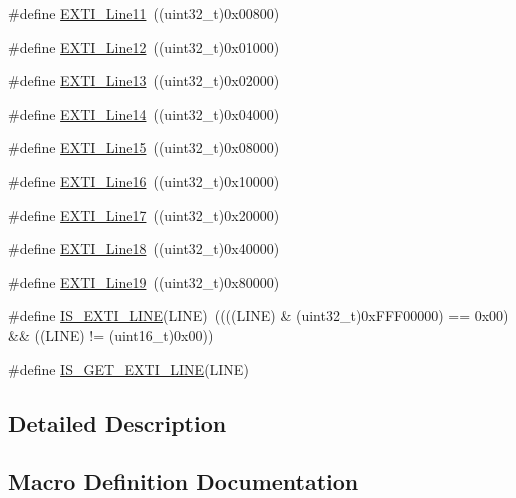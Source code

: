 \begin{DoxyCompactItemize}
\#define \mbox{\hyperlink{group___e_x_t_i___lines_ga6157b34c53e9b5cb8ee0d7ac3f5ba292}{E\+X\+T\+I\+\_\+\+Line11}}~((uint32\+\_\+t)0x00800)
\item 
\#define \mbox{\hyperlink{group___e_x_t_i___lines_gab73a0a31f1814118955099b9dd3bdfef}{E\+X\+T\+I\+\_\+\+Line12}}~((uint32\+\_\+t)0x01000)
\item 
\#define \mbox{\hyperlink{group___e_x_t_i___lines_gae382388ac34b78917a7bd06562e35c42}{E\+X\+T\+I\+\_\+\+Line13}}~((uint32\+\_\+t)0x02000)
\item 
\#define \mbox{\hyperlink{group___e_x_t_i___lines_ga7b3821ad1b7a00b49c27075688f48101}{E\+X\+T\+I\+\_\+\+Line14}}~((uint32\+\_\+t)0x04000)
\item 
\#define \mbox{\hyperlink{group___e_x_t_i___lines_gafc5ea85d1fc095a855fde8977a338c4c}{E\+X\+T\+I\+\_\+\+Line15}}~((uint32\+\_\+t)0x08000)
\item 
\#define \mbox{\hyperlink{group___e_x_t_i___lines_ga21326db7db8ca614c746b7f52dc45ead}{E\+X\+T\+I\+\_\+\+Line16}}~((uint32\+\_\+t)0x10000)
\item 
\#define \mbox{\hyperlink{group___e_x_t_i___lines_ga3e0fc18bc0722adc09605e3093b24c6a}{E\+X\+T\+I\+\_\+\+Line17}}~((uint32\+\_\+t)0x20000)
\item 
\#define \mbox{\hyperlink{group___e_x_t_i___lines_ga6cdf346a3e7a3c8dbb036aca6741207c}{E\+X\+T\+I\+\_\+\+Line18}}~((uint32\+\_\+t)0x40000)
\item 
\#define \mbox{\hyperlink{group___e_x_t_i___lines_ga49ac0744621f88d432d85838483ad1de}{E\+X\+T\+I\+\_\+\+Line19}}~((uint32\+\_\+t)0x80000)
\item 
\#define \mbox{\hyperlink{group___e_x_t_i___lines_gaade8b8717a1d78f83d3cf180e2817557}{I\+S\+\_\+\+E\+X\+T\+I\+\_\+\+L\+I\+NE}}(L\+I\+NE)~((((L\+I\+NE) \& (uint32\+\_\+t)0x\+F\+F\+F00000) == 0x00) \&\& ((\+L\+I\+N\+E) != (uint16\+\_\+t)0x00))
\item 
\#define \mbox{\hyperlink{group___e_x_t_i___lines_ga77c85c7b8426c6cfe91b4f5a2c58ecda}{I\+S\+\_\+\+G\+E\+T\+\_\+\+E\+X\+T\+I\+\_\+\+L\+I\+NE}}(L\+I\+NE)
\end{DoxyCompactItemize}


\subsection{Detailed Description}


\subsection{Macro Definition Documentation}
\mbox{\label{group___e_x_t_i___lines_gac2a65680200dd5f4f7eab29cd4091a75}} 
